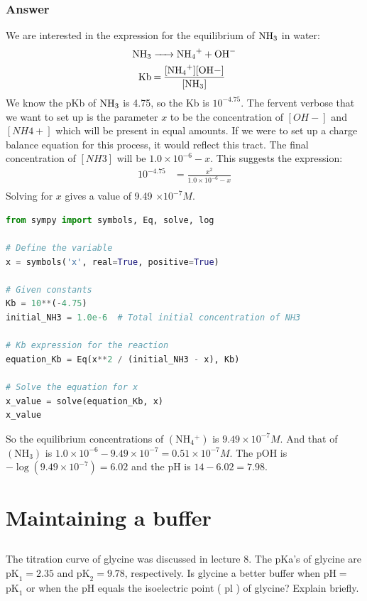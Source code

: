 \documentclass[12pt]{article}
\begin{document}
\subsubsection{Answer}
We are interested in the expression for the equilibrium of $\ce{NH3}$ in water:
\begin{align*}
  \ce{NH3 &-> NH4+ + OH-} \\
  \ce{Kb & = \frac{[NH4+][OH-]}{[NH3]}} \\
\end{align*}
We know the pKb of $\ce{NH3}$ is 4.75, so the Kb is $10^{-4.75}$. The fervent verbose that we want to set up is the parameter $x$ to be the concentration of $[OH-]$ and $[NH4+]$ which will be present in equal amounts. If we were to set up a charge balance equation for this process, it would reflect this tract. The final concentration of $[NH3]$ will be $1.0 \times 10^{-6} - x$. This suggests the expression:
\begin{align*}
  10^{-4.75} & = \frac{x^2}{1.0 \times 10^{-6} - x} \\
\end{align*}
Solving for $x$ gives a value of 9.49 $\times 10^{-7} M$.
\begin{lstlisting}[language=Python]
from sympy import symbols, Eq, solve, log

# Define the variable
x = symbols('x', real=True, positive=True)

# Given constants
Kb = 10**(-4.75)
initial_NH3 = 1.0e-6  # Total initial concentration of NH3

# Kb expression for the reaction
equation_Kb = Eq(x**2 / (initial_NH3 - x), Kb)

# Solve the equation for x
x_value = solve(equation_Kb, x)
x_value
\end{lstlisting}
So the equilibrium concentrations of $\left(\mathrm{NH}_{4}{ }^{+}\right)$ is $9.49 \times 10^{-7} M$. And that of $\left(\mathrm{NH}_{3}\right)$ is $1.0 \times 10^{-6} - 9.49 \times 10^{-7} = 0.51 \times 10^{-7} M$. The $\mathrm{pOH}$ is $-\log(9.49 \times 10^{-7}) = 6.02$ and the $\mathrm{pH}$ is $14 - 6.02 = 7.98$.






\section{Maintaining a buffer}
\subsection{}
The titration curve of glycine was discussed in lecture 8. The pKa's of glycine are $\mathrm{pK}_{1}=2.35$ and $\mathrm{pK}_{2}=9.78$, respectively. Is glycine a better buffer when $\mathrm{pH}=$ $\mathrm{pK}_{1}$ or when the $\mathrm{pH}$ equals the isoelectric point ( $\mathrm{pl}$ ) of glycine? Explain briefly.
\end{document}
